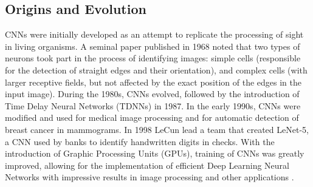 \subsection{Origins and Evolution}
\label{sec:convolution:convolutionalneuralnetworks:originsandevolution}
CNNs were initially developed as an attempt to replicate the processing of sight in living organisms.\newline
A seminal paper published in 1968\cite{Hubel1968} noted that two types of neurons took part in the process of identifying images: simple cells (responsible for the detection of straight edges and their orientation), and complex cells (with larger receptive fields, but not affected by the exact position of the edges in the input image).\newline
During the 1980s, CNNs evolved, followed by the introduction of Time Delay Neural Networks (TDNNs) in 1987\cite{Waibel1989}.\newline
In the early 1990s, CNNs were modified and used for medical image processing and for automatic detection of breast cancer in mammograms\cite{Zang1994}.\newline
In 1998 LeCun lead a team that created LeNet-5, a CNN used by banks to identify handwritten digits in checks.\newline
With the introduction of Graphic Processing Units (GPUs), training of CNNs was greatly improved, allowing for the implementation of efficient Deep Learning Neural Networks with impressive results in image processing and other applications \cite{Ciresan2013}.
